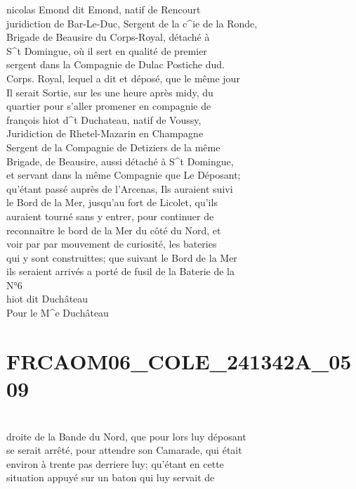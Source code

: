 \documentclass{article}
\begin{document}
\begin{pages}
nicolas Emond dit Emond, natif de Rencourt\\
juridiction de Bar-Le-Duc, Sergent de la c\^{}ie de la Ronde,\\
Brigade de Beausire du Corps-Royal, détaché à\\
S\^{}t Domingue, où il sert en qualité de premier\\
sergent dans la Compagnie de Dulac Postiche dud.\\
Corps. Royal, lequel a dit et déposé, que le même jour\\
Il serait Sortie, sur les une heure après midy, du\\
quartier pour s'aller promener en compagnie de\\
françois hiot d\^{}t Duchateau, natif de Voussy,\\
Juridiction de Rhetel-Mazarin en Champagne\\
Sergent de la Compagnie de Detiziers de la même\\
Brigade, de Beausire, aussi détaché à S\^{}t Domingue,\\
et servant dans la même Compagnie que Le Déposant;\\
qu'étant passé auprès de l'Arcenas, Ils auraient suivi\\
le Bord de la Mer, jusqu'au fort de Licolet, qu'ils\\
auraient tourné sans y entrer, pour continuer de\\
reconnaitre le bord de la Mer du côté du Nord, et\\
voir par par mouvement de curiosité, les bateries\\
qui y sont construittes; que suivant le Bord de la Mer\\
ils seraient arrivés a porté de fusil de la Baterie de la
\pend\pstart
\\
N°6\\
hiot dit Duchâteau\\
Pour le M\^{}e Duchâteau
\pend
\endnumbering\beginnumbering\section{FRCAOM06\_COLE\_241342A\_0509}\pstart
\\
droite de la Bande du Nord, que pour lors luy déposant\\
se serait arrêté, pour attendre son Camarade, qui était\\
environ à trente pas derriere luy; qu'étant en cette\\
situation appuyé sur un baton qui luy servait de\\

\end{pages}
\end{document}

